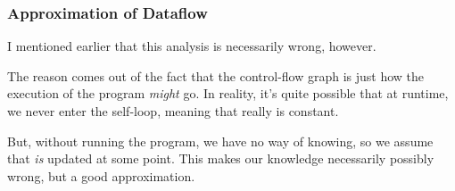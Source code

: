 \documentclass[aspectratio=169, handout]{beamer}
\begin{document}
\begin{frame}[fragile]
  \frametitle{Approximation of Dataflow}
  \begin{center}
    \begin{minipage}{0.65\textwidth}
      \raggedright
      I mentioned earlier that this analysis is necessarily wrong, however.

      \vspace{10pt}

      The reason comes out of the fact that the control-flow graph is just how
      the execution of the program \textit{might} go. In reality, it's quite
      possible that at runtime, we never enter the self-loop, meaning that
       really is constant.

      \vspace{10pt}

      But, without running the program, we have no way of knowing, so we
      assume that  \textit{is} updated at some point. This makes
      our knowledge necessarily possibly wrong, but a good approximation.
    \end{minipage}
    \begin{minipage}{0.3\textwidth}
      \centering
    \end{minipage}
  \end{center}
\end{frame}
\end{document}

